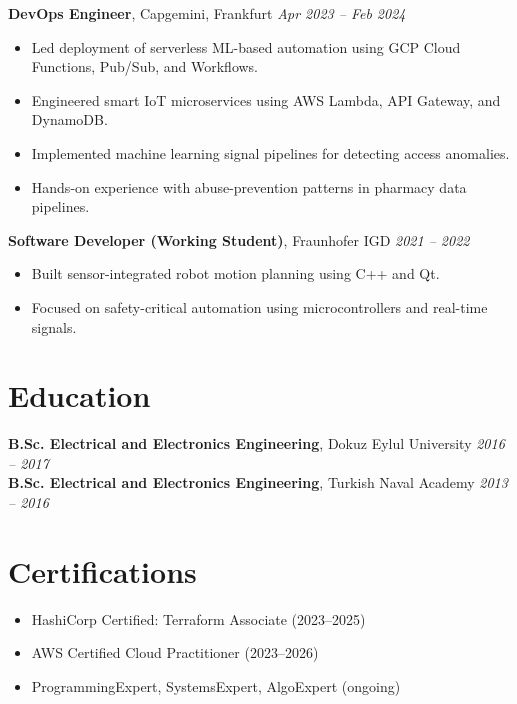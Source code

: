 \documentclass[a4paper,10pt]{article}
\begin{document}
\textbf{DevOps Engineer}, Capgemini, Frankfurt \hfill \textit{Apr 2023 -- Feb 2024} \\
\vspace{-6pt}
\begin{itemize}
    \item Led deployment of serverless ML-based automation using GCP Cloud Functions, Pub/Sub, and Workflows.
    \item Engineered smart IoT microservices using AWS Lambda, API Gateway, and DynamoDB.
    \item Implemented machine learning signal pipelines for detecting access anomalies.
    \item Hands-on experience with abuse-prevention patterns in pharmacy data pipelines.
\end{itemize}

\textbf{Software Developer (Working Student)}, Fraunhofer IGD \hfill \textit{2021 -- 2022} \\
\vspace{-6pt}
\begin{itemize}
    \item Built sensor-integrated robot motion planning using C++ and Qt.
    \item Focused on safety-critical automation using microcontrollers and real-time signals.
\end{itemize}

\section*{Education}
\textbf{B.Sc. Electrical and Electronics Engineering}, Dokuz Eylul University \hfill \textit{2016 -- 2017} \\
\textbf{B.Sc. Electrical and Electronics Engineering}, Turkish Naval Academy \hfill \textit{2013 -- 2016}

\section*{Certifications}
\begin{itemize}
    \item HashiCorp Certified: Terraform Associate (2023--2025)
    \item AWS Certified Cloud Practitioner (2023--2026)
    \item ProgrammingExpert, SystemsExpert, AlgoExpert (ongoing)
\end{itemize}
\end{document}
